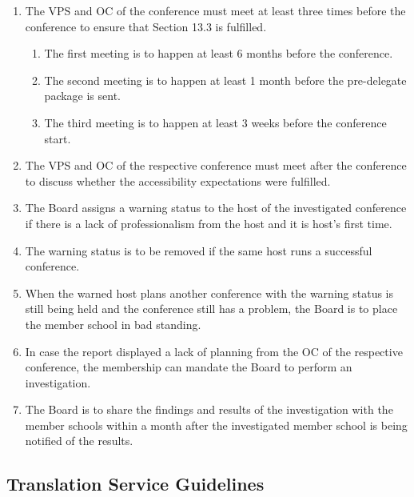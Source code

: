 \begin{enumerate}
 \item
  The VPS and OC of the conference must meet at least three times before the conference to ensure that Section 13.3 is fulfilled.

  \begin{enumerate}
   \item
    The first meeting is to happen at least 6 months before the conference.
   \item
    The second meeting is to happen at least 1 month before the pre-delegate package is sent.
   \item
    The third meeting is to happen at least 3 weeks before the conference start.
  \end{enumerate}

 \item
  The VPS and OC of the respective conference must meet after the conference to discuss whether the accessibility expectations were fulfilled.
 \item
  The Board assigns a warning status to the host of the investigated conference if there is a lack of professionalism from the host and it is host's first time.
 \item
  The warning status is to be removed if the same host runs a successful conference.
 \item
  When the warned host plans another conference with the warning status is still being held and the conference still has a problem, the Board is to place the member school in bad standing.
 \item
  In case the report displayed a lack of planning from the OC of the respective conference, the membership can mandate the Board to perform an investigation.
 \item
  The Board is to share the findings and results of the investigation with the member schools within a month after the investigated member school is being notified of the results.
\end{enumerate}

\subsection{Translation Service Guidelines}
\label{translation-service-guidelines}

